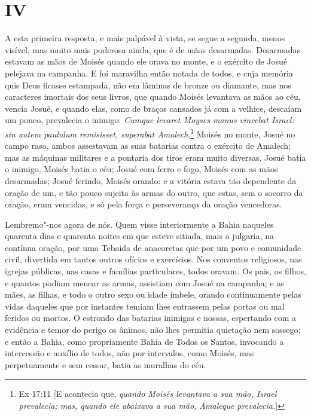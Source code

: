 \section{IV}

A esta primeira resposta, e mais palpável à vista, se segue a
segunda, menos visível, mas muito mais poderosa ainda, que é de mãos
desarmadas. Desarmadas estavam as mãos de Moisés quando ele orava no
monte, e o exército de Josué pelejava na campanha. E foi maravilha então
notada de todos, e cuja memória quis Deus ficasse estampada, não em
lâminas de bronze ou diamante, mas nos caracteres imortais dos seus
livros, que quando Moisés levantava as mãos ao céu, vencia Josué, e
quando elas, como de braços cansados já com a velhice, descaíam um
pouco, prevalecia o inimigo: \emph{Cumque levaret Moyses manus vincebat
Israel: sin autem paululum remisisset, superabat Amalech}.\footnote{Ex 17:11 [E acontecia que, \textit{quando Moisés levantava a sua mão, Israel prevalecia; mas, quando ele abaixava a sua mão, Amaleque prevalecia.}]}
Moisés no monte, Josué no campo raso, ambos assestavam as suas batarias
contra o exército de Amalech; mas as máquinas militares e a pontaria dos
tiros eram muito diversas. Josué batia o inimigo, Moisés batia o céu;
Josué com ferro e fogo, Moisés com as mãos desarmadas; Josué ferindo,
Moisés orando: e a vitória estava tão dependente da oração de um, e tão
pouco sujeita às armas do outro, que estas, sem o socorro da oração,
eram vencidas, e só pela força e perseverança da oração vencedoras.

Lembremo"-nos agora de nós. Quem visse interiormente a Bahia
naqueles quarenta dias e quarenta noites em que esteve sitiada, mais a
julgaria, na contínua oração, por uma Tebaida de anacoretas que por um
povo e comunidade civil, divertida em tantos outros ofícios e
exercícios. Nos conventos religiosos, nas igrejas públicas, nas casas e
famílias particulares, todos oravam. Os pais, os filhos, e quantos
podiam menear as armas, assistiam com Josué na campanha; e as mães, as
filhas, e todo o outro sexo ou idade imbele, orando continuamente pelas
vidas daqueles que por instantes temiam lhes entrassem pelas portas ou
mal feridos ou mortos. O estrondo
das batarias inimigas e nossas, espertando com a evidência e temor
do perigo os ânimos, não lhes permitia quietação nem sossego; e então a
Bahia, como propriamente Bahia de Todos os Santos, invocando a
intercessão e auxílio de todos, não por intervalos, como Moisés, mas
perpetuamente e sem cessar, batia as muralhas do céu.

